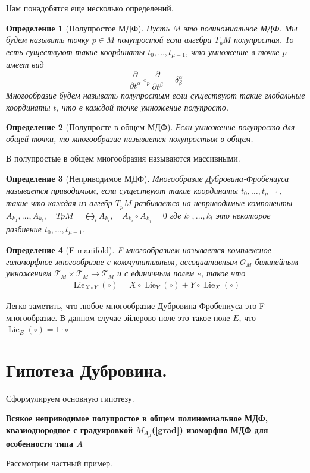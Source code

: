 \documentclass[a4paper, 10pt]{article}
\theoremstyle{plain}
\newtheorem{defin}{Определение}
\newcommand{\tang}[1][\hspace{0pt}]{\frac{\partial }{\partial #1}}
\begin{document}
Нам понадобятся еще несколько определений.
\begin{defin}[Полупростое МДФ]
    Пусть \(M\) это полиномиальное МДФ. Мы будем называть точку \(p \in M\) полупростой если алгебра \(T_pM\) полупростая. То есть существуют такие координаты \(t_0, \dots, t_{\mu-1}\), что умножение в точке \(p\) имеет вид \[\tang[t^\alpha]\circ_p\tang[t^\beta] = \delta^\alpha_\beta\]
    Многообразие будем называть полупростым если существуют такие глобальные координаты \(t\), что в каждой точке умножение полупросто.
\end{defin}
\begin{defin}[Полупросте в общем МДФ]
    Если умножение полупросто для общей точки, то многообразие называется полупростым в общем.
\end{defin}
В \cite{hertling1999multiplicationtangentbundle} полупростые в общем многообразия называются массивными.
\begin{defin}[Неприводимое МДФ]
    Многообразие Дубровина-Фробениуса называется приводимым, если существуют такие координаты \(t_0, \dots, t_{\mu-1}\), такие что каждая из алгебр \(T_pM\) разбивается на неприводимые компоненты \(A_{k_1}, \dots, A_{k_l},\quad TpM = \bigoplus_i A_{k_i}, \quad A_{k_i}\circ A_{k_j} = 0\) где \(k_1, \dots, k_l\) это некоторое разбиение \(t_0, \dots, t_{\mu-1}\).
\end{defin}
\begin{defin}[F-manifold]
    F-многообразием называется комплексное голоморфное многообразие с коммутативным, ассоциативным \(\mathcal{O}_M\)-билинейным умножением \(\mathcal{T}_M \times \mathcal{T}_M \to \mathcal{T}_M\) и с единичным полем \(e\), такое что 
    \begin{gather}\label{integr}
         \operatorname{Lie}_{X\circ Y}(\circ) = X\circ \operatorname{Lie}_Y(\circ) + Y\circ \operatorname{Lie}_X(\circ)
    \end{gather}
\end{defin}
Легко заметить, что любое многообразие Дубровина-Фробениуса это F-многообразие.
В данном случае эйлерово поле это такое поле \(E\), что \(\operatorname{Lie}_E(\circ) = 1 \cdot \circ\)
\section{Гипотеза Дубровина.}
Сформулируем основную гипотезу. \par 
\begin{center}
    \textbf{
        Всякое неприводимое полупростое в общем полиномиальное МДФ, квазиоднородное с градуировкой \(M_{A_\mu}\)(\ref{grad}) изоморфно МДФ для особенности типа \(A\)}
\end{center}
Рассмотрим частный пример.
\end{document}
